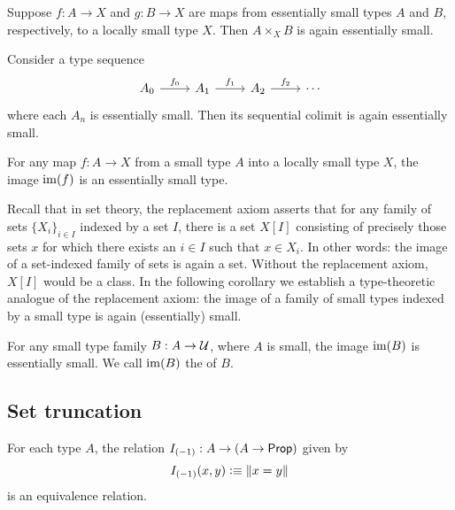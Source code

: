 \begin{cor}
Suppose $f:A\to X$ and $g:B\to X$ are maps from essentially small types $A$ and $B$, respectively, to a locally small type $X$. Then $A\times_X B$ is again essentially small. 
\end{cor}

\begin{lem}
Consider a type sequence
\begin{equation*}
\begin{tikzcd}
A_0 \arrow[r,"f_0"] & A_1 \arrow[r,"f_1"] & A_2 \arrow[r,"f_2"] & \cdots
\end{tikzcd}
\end{equation*}
where each $A_n$ is essentially small. Then its sequential colimit is again essentially small. 
\end{lem}

\begin{thm}
For any map $f:A\to X$ from a small type $A$ into a locally small type $X$, the image $\operatorname{im}(f)$ is an essentially small type.
\end{thm}

Recall that in set theory, the replacement axiom asserts that for any family of sets $\{X_i\}_{i\in I}$ indexed by a set $I$, there is a set $X[I]$ consisting of precisely those sets $x$ for which there exists an $i\in I$ such that $x\in X_i$. In other words: the image of a set-indexed family of sets is again a set. Without the replacement axiom, $X[I]$ would be a class. In the following corollary we establish a type-theoretic analogue of the replacement axiom: the image of a family of small types indexed by a small type is again (essentially) small.

\begin{cor}\label{cor:im_small}
For any small type family $B:A\to\mathcal{U}$, where $A$ is small, the image $\operatorname{im}(B)$ is essentially small. We call $\operatorname{im}(B)$ the  of $B$. 
\end{cor}

\subsection{Set truncation}

\begin{lem}
For each type $A$, the relation $I_{(-1)}:A\to (A\to\mathsf{Prop})$ given by
\begin{equation*}
I_{(-1)}(x,y)\vcentcolon\equiv\Vert x=y\Vert_{}
\end{equation*}
is an equivalence relation.
\end{lem}

